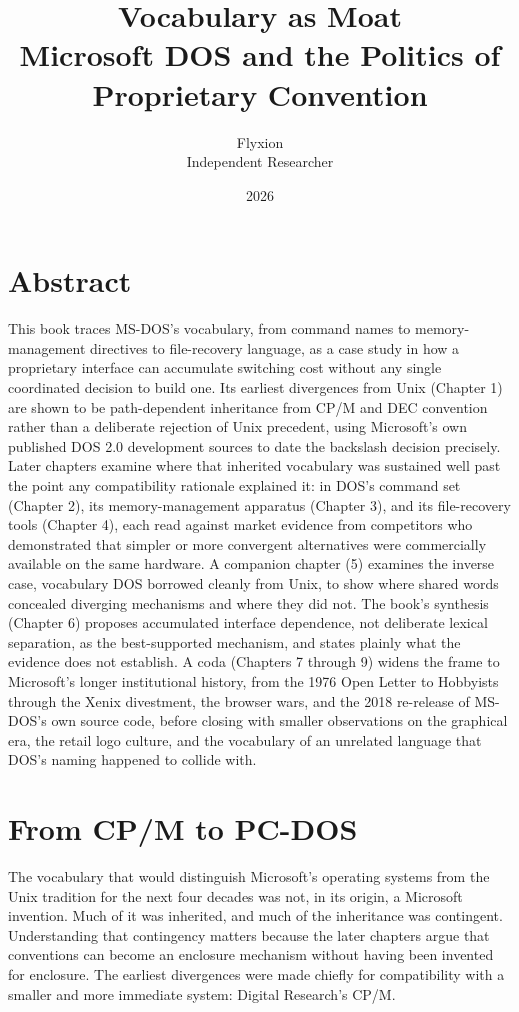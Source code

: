 \documentclass[11pt]{book}
\title{\textbf{Vocabulary as Moat}\\[0.3em]\large Microsoft DOS and the Politics of Proprietary Convention}
\author{Flyxion \\ \small Independent Researcher}
\date{2026}
\begin{document}
\frontmatter
\maketitle

\chapter*{Abstract}

This book traces MS-DOS's vocabulary, from command names to memory-management directives to file-recovery language, as a case study in how a proprietary interface can accumulate switching cost without any single coordinated decision to build one. Its earliest divergences from Unix (Chapter 1) are shown to be path-dependent inheritance from CP/M and DEC convention rather than a deliberate rejection of Unix precedent, using Microsoft's own published DOS 2.0 development sources to date the backslash decision precisely. Later chapters examine where that inherited vocabulary was sustained well past the point any compatibility rationale explained it: in DOS's command set (Chapter 2), its memory-management apparatus (Chapter 3), and its file-recovery tools (Chapter 4), each read against market evidence from competitors who demonstrated that simpler or more convergent alternatives were commercially available on the same hardware. A companion chapter (5) examines the inverse case, vocabulary DOS borrowed cleanly from Unix, to show where shared words concealed diverging mechanisms and where they did not. The book's synthesis (Chapter 6) proposes accumulated interface dependence, not deliberate lexical separation, as the best-supported mechanism, and states plainly what the evidence does not establish. A coda (Chapters 7 through 9) widens the frame to Microsoft's longer institutional history, from the 1976 Open Letter to Hobbyists through the Xenix divestment, the browser wars, and the 2018 re-release of MS-DOS's own source code, before closing with smaller observations on the graphical era, the retail logo culture, and the vocabulary of an unrelated language that DOS's naming happened to collide with.

\tableofcontents

\mainmatter

\chapter{From CP/M to PC-DOS}

The vocabulary that would distinguish Microsoft's operating systems from the Unix tradition for the next four decades was not, in its origin, a Microsoft invention. Much of it was inherited, and much of the inheritance was contingent. Understanding that contingency matters because the later chapters argue that conventions can become an enclosure mechanism without having been invented for enclosure. The earliest divergences were made chiefly for compatibility with a smaller and more immediate system: Digital Research's CP/M.
\end{document}
